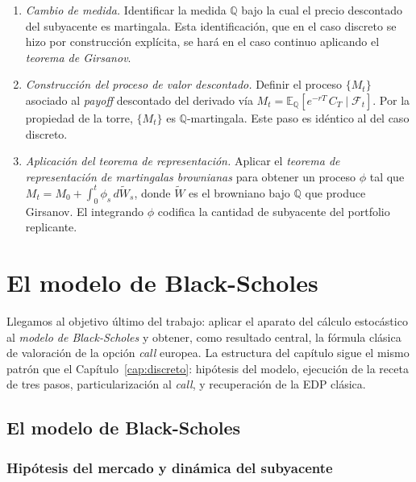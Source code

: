 \documentclass[11pt,a4paper,oneside]{report}
\theoremstyle{plain}
\theoremstyle{definition}
\theoremstyle{remark}
\newcommand{\E}{\mathbb{E}}
\newcommand{\Q}{\mathbb{Q}}
\newcommand{\F}{\mathcal{F}}
\newcommand{\1}{\mathbf{1}}
\begin{document}
\begin{enumerate}[label=\textbf{Paso \arabic*.}, leftmargin=*]
  \item \emph{Cambio de medida.} Identificar la medida $\Q$ bajo la
        cual el precio descontado del subyacente es martingala. Esta
        identificación, que en el caso discreto se hizo por
        construcción explícita, se hará en el caso continuo aplicando
        el \emph{teorema de Girsanov}.
  \item \emph{Construcción del proceso de valor descontado.} Definir
        el proceso $\{M_t\}$ asociado al \emph{payoff} descontado del
        derivado vía $M_t = \E_\Q[e^{-rT}\, C_T \mid \F_t]$. Por la
        propiedad de la torre, $\{M_t\}$ es $\Q$-martingala. Este paso
        es idéntico al del caso discreto.
  \item \emph{Aplicación del teorema de representación.} Aplicar el
        \emph{teorema de representación de martingalas brownianas} para
        obtener un proceso $\phi$ tal que $M_t = M_0 + \int_0^t \phi_s\,
        d\widetilde{W}_s$, donde $\widetilde{W}$ es el browniano bajo
        $\Q$ que produce Girsanov. El integrando $\phi$ codifica la
        cantidad de subyacente del portfolio replicante.
\end{enumerate}

\chapter{El modelo de Black-Scholes}\label{cap:bs}

Llegamos al objetivo último del trabajo: aplicar el aparato del
cálculo estocástico al \emph{modelo de Black-Scholes} y obtener,
como resultado central, la fórmula clásica de valoración de la
opción \emph{call} europea. La estructura del capítulo sigue el mismo patrón que el Capítulo~\ref{cap:discreto}: hipótesis del modelo, ejecución de
la receta de tres pasos, particularización al \emph{call}, y
recuperación de la EDP clásica.

\section{El modelo de Black-Scholes}
\label{sec:modelo_bs}

\subsection{Hipótesis del mercado y dinámica del subyacente}
\label{subsec:hipotesis_modelo_bs}
\end{document}
